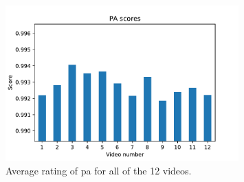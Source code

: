 \begin{figure}[H]
    \centering
    \includegraphics[width=0.8\textwidth]{img/objective_measures/PA.pdf}
    \caption{Average rating of \acrlong{pa} for all of the 12 videos.}
    \label{fig:video_rating_pa}
\end{figure}